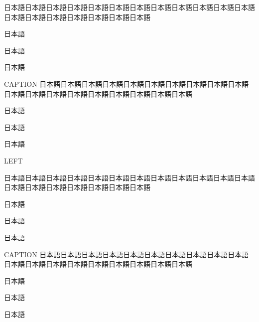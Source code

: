 \clearpage

\begin{rv@bothsidelinebox@nocaption}
日本語日本語日本語日本語日本語日本語日本語日本語日本語日本語日本語日本語日本語日本語日本語日本語日本語日本語日本語

日本語

日本語

日本語
\end{rv@bothsidelinebox@nocaption}

\begin{rv@bothsidelinebox@caption}{CAPTION}
日本語日本語日本語日本語日本語日本語日本語日本語日本語日本語日本語日本語日本語日本語日本語日本語日本語日本語日本語

日本語

日本語

日本語
\end{rv@bothsidelinebox@caption}

\clearpage

LEFT

\begin{rv@leftsidelinebox@nocaption}
日本語日本語日本語日本語日本語日本語日本語日本語日本語日本語日本語日本語日本語日本語日本語日本語日本語日本語日本語

日本語

日本語

日本語
\end{rv@leftsidelinebox@nocaption}

\begin{rv@leftsidelinebox@caption}{CAPTION}
日本語日本語日本語日本語日本語日本語日本語日本語日本語日本語日本語日本語日本語日本語日本語日本語日本語日本語日本語

日本語

日本語

日本語
\end{rv@leftsidelinebox@caption}

\endinput

simplesquarebox

\begin{simplesquarebox}{CAPTION}

TEST, TEST, TEST

\end{simplesquarebox}

\begin{simplesquarebox}{}

TEST, TEST, TEST

\end{simplesquarebox}


